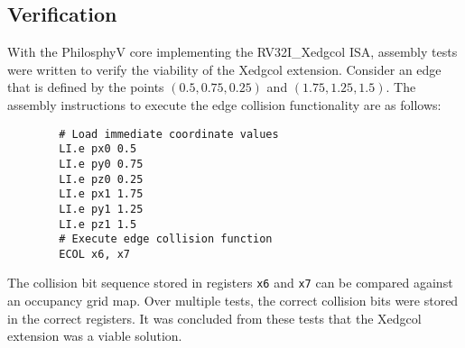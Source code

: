     \subsection{Verification}
        With the PhilosphyV core implementing the RV32I\_Xedgcol ISA, assembly tests were written to verify the viability of the Xedgcol extension. Consider an edge that is defined by the points $(0.5, 0.75, 0.25)$ and $(1.75, 1.25, 1.5)$. The assembly instructions to execute the edge collision functionality are as follows:

        \begin{verbatim}
        # Load immediate coordinate values
        LI.e px0 0.5
        LI.e py0 0.75
        LI.e pz0 0.25
        LI.e px1 1.75
        LI.e py1 1.25
        LI.e pz1 1.5
        # Execute edge collision function
        ECOL x6, x7
        \end{verbatim}

        The collision bit sequence stored in registers \texttt{x6} and \texttt{x7} can be compared against an occupancy grid map. Over multiple tests, the correct collision bits were stored in the correct registers. It was concluded from these tests that the Xedgcol extension was a viable solution.
